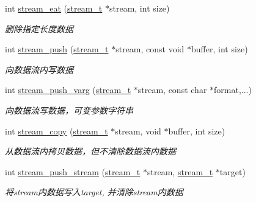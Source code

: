 \begin{DoxyCompactItemize}
int \hyperlink{a00107_ga1ab922f8bab979099b3abc3ee54dc59d_ga1ab922f8bab979099b3abc3ee54dc59d}{stream\+\_\+eat} (\hyperlink{a00050_a261dba04f46f5c59a68a05f69f5a65a8_a261dba04f46f5c59a68a05f69f5a65a8}{stream\+\_\+t} $\ast$stream, int size)
\begin{DoxyCompactList}\small\item\em 删除指定长度数据 \end{DoxyCompactList}\item 
int \hyperlink{a00107_gae7e63ef142733eb3aea7401e28bc9a75_gae7e63ef142733eb3aea7401e28bc9a75}{stream\+\_\+push} (\hyperlink{a00050_a261dba04f46f5c59a68a05f69f5a65a8_a261dba04f46f5c59a68a05f69f5a65a8}{stream\+\_\+t} $\ast$stream, const void $\ast$buffer, int size)
\begin{DoxyCompactList}\small\item\em 向数据流内写数据 \end{DoxyCompactList}\item 
int \hyperlink{a00107_ga9631c1d90e0fad04b6ad04ccc5b95808_ga9631c1d90e0fad04b6ad04ccc5b95808}{stream\+\_\+push\+\_\+varg} (\hyperlink{a00050_a261dba04f46f5c59a68a05f69f5a65a8_a261dba04f46f5c59a68a05f69f5a65a8}{stream\+\_\+t} $\ast$stream, const char $\ast$format,...)
\begin{DoxyCompactList}\small\item\em 向数据流写数据，可变参数字符串 \end{DoxyCompactList}\item 
int \hyperlink{a00107_ga380555bf71ee99f6b2bb4f76738d507f_ga380555bf71ee99f6b2bb4f76738d507f}{stream\+\_\+copy} (\hyperlink{a00050_a261dba04f46f5c59a68a05f69f5a65a8_a261dba04f46f5c59a68a05f69f5a65a8}{stream\+\_\+t} $\ast$stream, void $\ast$buffer, int size)
\begin{DoxyCompactList}\small\item\em 从数据流内拷贝数据，但不清除数据流内数据 \end{DoxyCompactList}\item 
int \hyperlink{a00107_gad5336c2b89b6edea5f277d5ebc221e15_gad5336c2b89b6edea5f277d5ebc221e15}{stream\+\_\+push\+\_\+stream} (\hyperlink{a00050_a261dba04f46f5c59a68a05f69f5a65a8_a261dba04f46f5c59a68a05f69f5a65a8}{stream\+\_\+t} $\ast$stream, \hyperlink{a00050_a261dba04f46f5c59a68a05f69f5a65a8_a261dba04f46f5c59a68a05f69f5a65a8}{stream\+\_\+t} $\ast$target)
\begin{DoxyCompactList}\small\item\em 将stream内数据写入target, 并清除stream内数据 \end{DoxyCompactList}\item 

\end{DoxyCompactItemize}
